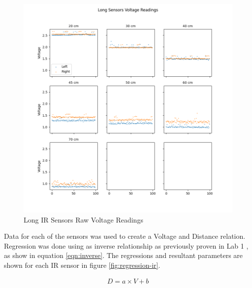 \documentclass[12pt]{article}
\begin{document}
\begin{figure}[H]
    \centering
    \includegraphics[width=\linewidth]{images/Long Sensors Voltage Readings.png}
    \caption{Long IR Sensors Raw Voltage Readings}
    \label{fig:raw-long-ir} %
\end{figure}

Data for each of the sensors was used to create a Voltage and Distance relation. Regression was done using as inverse relationship as previously proven in Lab 1 \cite{lab-1}, as show in equation \ref{eqn:inverse}. The regressions and resultant parameters are shown for each IR sensor in figure \ref{fig:regression-ir}.

\begin{gather}
    \label{eqn:inverse}
    D = a \times V + b
\end{gather}
\end{document}
